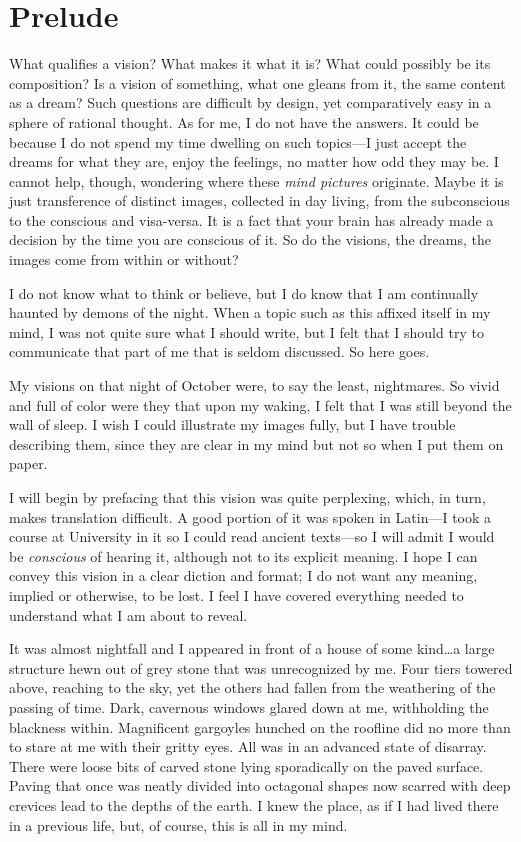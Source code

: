 \section{Prelude}\label{prelude}

What qualifies a vision? What makes it what it is? What could possibly
be its composition? Is a vision of something, what one gleans from it,
the same content as a dream? Such questions are difficult by design, yet
comparatively easy in a sphere of rational thought. As for me, I do not
have the answers. It could be because I do not spend my time dwelling on
such topics---I just accept the dreams for what they are, enjoy the
feelings, no matter how odd they may be. I cannot help, though,
wondering where these \emph{mind pictures} originate. Maybe it is just
transference of distinct images, collected in day living, from the
subconscious to the conscious and visa-versa. It is a fact that your
brain has already made a decision by the time you are conscious of it.
So do the visions, the dreams, the images come from within or without?

I do not know what to think or believe, but I do know that I am
continually haunted by demons of the night. When a topic such as this
affixed itself in my mind, I was not quite sure what I should write, but
I felt that I should try to communicate that part of me that is seldom
discussed. So here goes.

My visions on that night of October were, to say the least, nightmares.
So vivid and full of color were they that upon my waking, I felt that I
was still beyond the wall of sleep. I wish I could illustrate my images
fully, but I have trouble describing them, since they are clear in my
mind but not so when I put them on paper.

I will begin by prefacing that this vision was quite perplexing, which,
in turn, makes translation difficult. A good portion of it was spoken in
Latin---I took a course at University in it so I could read ancient
texts---so I will admit I would be \emph{conscious} of hearing it,
although not to its explicit meaning. I hope I can convey this vision in
a clear diction and format; I do not want any meaning, implied or
otherwise, to be lost. I feel I have covered everything needed to
understand what I am about to reveal.

It was almost nightfall and I appeared in front of a house of some
kind\ldots a large structure hewn out of grey stone that was
unrecognized by me. Four tiers towered above, reaching to the sky, yet
the others had fallen from the weathering of the passing of time. Dark,
cavernous windows glared down at me, withholding the blackness within.
Magnificent gargoyles hunched on the roofline did no more than to stare
at me with their gritty eyes. All was in an advanced state of disarray.
There were loose bits of carved stone lying sporadically on the paved
surface. Paving that once was neatly divided into octagonal shapes now
scarred with deep crevices lead to the depths of the earth. I knew the
place, as if I had lived there in a previous life, but, of course, this
is all in my mind.

